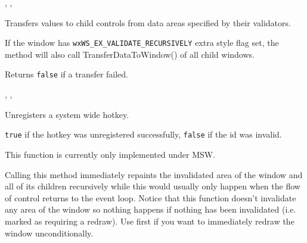 
,\rtfsp
{}, 


\label{wxwindowtransferdatatowindow}


Transfers values to child controls from data areas specified by their validators.

If the window has {\tt wxWS\_EX\_VALIDATE\_RECURSIVELY} extra style flag set,
the method will also call TransferDataToWindow() of all child windows.


Returns {\tt false} if a transfer failed.


,\rtfsp
{}, 


\label{wxwindowunregisterhotkey}


Unregisters a system wide hotkey.




{\tt true} if the hotkey was unregistered successfully, {\tt false} if the id was invalid.


This function is currently only implemented under MSW.




\label{wxwindowupdate}


Calling this method immediately repaints the invalidated area of the window and
all of its children recursively while this would usually only happen when the
flow of control returns to the event loop. 
Notice that this function doesn't invalidate any area of the window so
nothing happens if nothing has been invalidated (i.e. marked as requiring
a redraw). Use  first if you want to
immediately redraw the window unconditionally.


